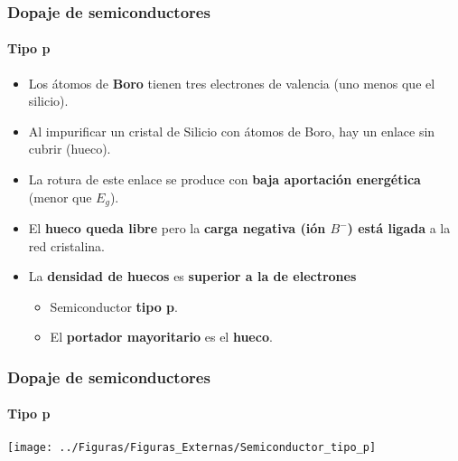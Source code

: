 \documentclass[xcolor=dvipsnames]{beamer}
\begin{document}
\begin{frame}
  \frametitle{Dopaje de semiconductores}
  \framesubtitle{Tipo p}

  \begin{itemize}
  \item Los átomos de \textbf{Boro} tienen tres electrones de valencia
    (uno menos que el silicio).
  \item Al impurificar un cristal de Silicio con átomos de Boro, hay
    un enlace sin cubrir (hueco).
  \item La rotura de este enlace se produce con \textbf{baja
      aportación energética} (menor que $E_{g}$).
  \item El \textbf{hueco queda libre} pero la \textbf{carga negativa
      (ión $B^{-}$) está ligada} a la red cristalina.
  \item La \textbf{densidad de huecos} es \textbf{superior a la de
      electrones}

    \begin{itemize}
    \item Semiconductor \textbf{tipo p}.
    \item El \textbf{portador mayoritario} es el \textbf{hueco}.
    \end{itemize}
  \end{itemize}

\end{frame}

\begin{frame}
  \frametitle{Dopaje de semiconductores}
  \framesubtitle{Tipo p}

  \begin{center}
    \texttt{[image: ../Figuras/Figuras\_Externas/Semiconductor\_tipo\_p]}
    \par\end{center}

\end{frame}
\end{document}

